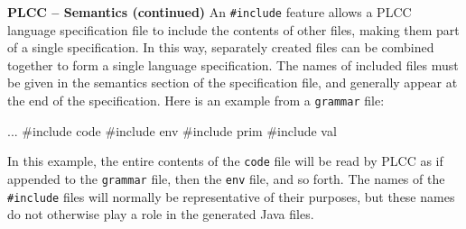 \begin{minipage}[t]{\sw}
\slidenumber
\LARGE
{\bf PLCC -- Semantics (continued)}\exx
An \verb'#include' feature allows a PLCC language specification file
to include the contents of other files,
making them part of a single specification.
In this way, separately created files
can be combined together to form a single language specification.
The names of included files must be given in the semantics section
of the specification file, and generally appear
at the end of the specification.
Here is an example from a \verb'grammar' file:
\begin{qv}
...
#include code
#include env
#include prim
#include val
\end{qv}
In this example, the entire contents of the \verb'code' file will be
read by PLCC as if appended to the \verb'grammar' file,
then the \verb'env' file, and so forth.
The names of the \verb'#include' files
will normally be representative of their purposes,
but these names do not otherwise play a role
in the generated Java files.
\end{minipage}
\clearpage
